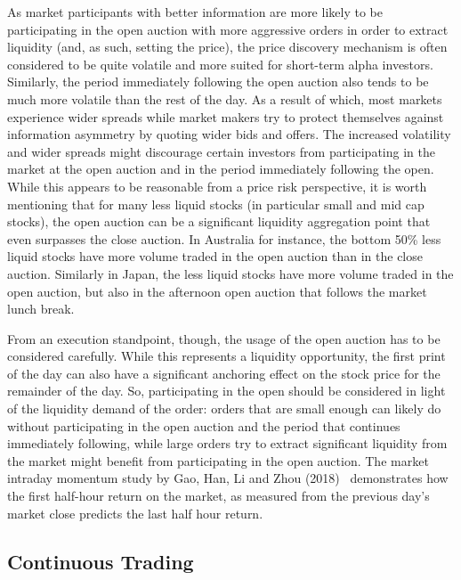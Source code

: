 As market participants with better information are more likely to be participating in the open auction with more aggressive orders in order to extract liquidity (and, as such, setting the price), the price discovery mechanism is often considered to be quite volatile and more suited for short-term alpha investors. Similarly, the period immediately following the open auction also tends to be much more volatile than the rest of the day. As a result of which, most markets experience wider spreads while market makers try to protect themselves against information asymmetry by quoting wider bids and offers. The increased volatility and wider spreads might discourage certain investors from participating in the market at the open auction and in the period immediately following the open. While this appears to be reasonable from a price risk perspective, it is worth mentioning that for many less liquid stocks (in particular small and mid cap stocks), the open auction can be a significant liquidity aggregation point that even surpasses the close auction. In Australia for instance, the bottom 50\% less liquid stocks have more volume traded in the open auction than in the close auction. Similarly in Japan, the less liquid stocks have more volume traded in the open auction, but also in the afternoon open auction that follows the market lunch break. 


From an execution standpoint, though, the usage of the open auction has to be considered carefully. While this represents a liquidity opportunity, the first print of the day can also have a significant anchoring effect on the stock price for the remainder of the day. So, participating in the open should be considered in light of the liquidity demand of the order: orders that are small enough can likely do without participating in the open auction and the period that continues immediately following, while large orders try to extract significant liquidity from the market might benefit from participating in the open auction. The market intraday momentum study by Gao, Han, Li and Zhou (2018)~\cite{ghliz} demonstrates how the first half-hour return on the market, as measured from the previous day's market close predicts the last half hour return.



\subsection{Continuous Trading\label{sec:continuous_trading}} \label{in:cont_trade1}

